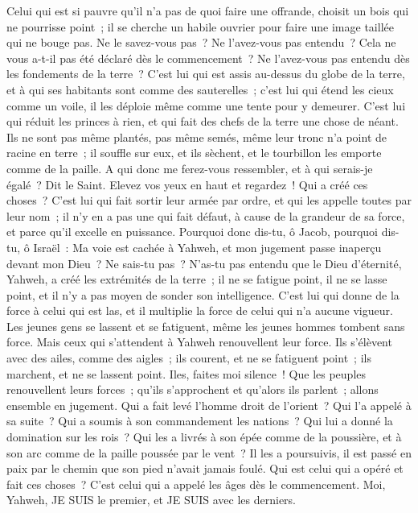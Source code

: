 \begin{multicols}{2}
Celui qui est si pauvre qu'il n'a pas de quoi faire une offrande, choisit un bois qui ne pourrisse point~; il se cherche un habile ouvrier pour faire une image taillée qui ne bouge pas.
Ne le savez-vous pas~? Ne l'avez-vous pas entendu~? Cela ne vous a-t-il pas été déclaré dès le commencement~? Ne l'avez-vous pas entendu dès les fondements de la terre~?
C'est lui qui est assis au-dessus du globe de la terre, et à qui ses habitants sont comme des sauterelles~; c'est lui qui étend les cieux comme un voile, il les déploie même comme une tente pour y demeurer.
C'est lui qui réduit les princes à rien, et qui fait des chefs de la terre une chose de néant.
Ils ne sont pas même plantés, pas même semés, même leur tronc n'a point de racine en terre~; il souffle sur eux, et ils sèchent, et le tourbillon les emporte comme de la paille.
A qui donc me ferez-vous ressembler, et à qui serais-je égalé~? Dit le Saint.
Elevez vos yeux en haut et regardez~! Qui a créé ces choses~? C'est lui qui fait sortir leur armée par ordre, et qui les appelle toutes par leur nom~; il n'y en a pas une qui fait défaut, à cause de la grandeur de sa force, et parce qu'il excelle en puissance.
Pourquoi donc dis-tu, ô Jacob, pourquoi dis-tu, ô Israël~: Ma voie est cachée à Yahweh, et mon jugement passe inaperçu devant mon Dieu~?
Ne sais-tu pas~? N'as-tu pas entendu que le Dieu d'éternité, Yahweh, a créé les extrémités de la terre~; il ne se fatigue point, il ne se lasse point, et il n'y a pas moyen de sonder son intelligence.
C'est lui qui donne de la force à celui qui est las, et il multiplie la force de celui qui n'a aucune vigueur.
Les jeunes gens se lassent et se fatiguent, même les jeunes hommes tombent sans force.
Mais ceux qui s'attendent à Yahweh renouvellent leur force. Ils s'élèvent avec des ailes, comme des aigles~; ils courent, et ne se fatiguent point~; ils marchent, et ne se lassent point.
\VerseOne{}Iles, faites moi silence~! Que les peuples renouvellent leurs forces~; qu'ils s'approchent et qu'alors ils parlent~; allons ensemble en jugement.
Qui a fait levé l'homme droit de l'orient~? Qui l'a appelé à sa suite~? Qui a soumis à son commandement les nations~? Qui lui a donné la domination sur les rois~? Qui les a livrés à son épée comme de la poussière, et à son arc comme de la paille poussée par le vent~?
Il les a poursuivis, il est passé en paix par le chemin que son pied n'avait jamais foulé.
Qui est celui qui a opéré et fait ces choses~? C'est celui qui a appelé les âges dès le commencement. Moi, Yahweh, JE SUIS le premier, et JE SUIS avec les derniers.

\end{multicols}
